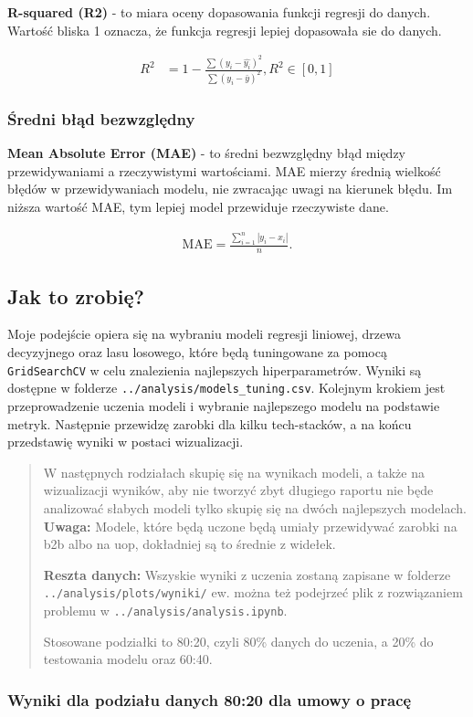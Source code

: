 \documentclass[a4paper]{article}
\begin{document}
\quad \textbf{R-squared (R2)} - to miara oceny dopasowania funkcji regresji do danych. Wartość bliska 1 oznacza, że funkcja regresji lepiej dopasowała sie do danych.

\begin{align} R^2&=1-\frac{\sum({y_i}-\hat{y_i})^2}{\sum(y_i-\bar{y})^2}, R^2 \in [0, 1] \end{align}

\subsubsection{Średni błąd bezwzględny}

\quad \textbf{Mean Absolute Error (MAE)} - to średni bezwzględny błąd między przewidywaniami a rzeczywistymi wartościami. MAE mierzy średnią wielkość błędów w przewidywaniach modelu, nie zwracając uwagi na kierunek błędu. Im niższa wartość MAE, tym lepiej model przewiduje rzeczywiste dane.

\begin{align}
    {\displaystyle \mathrm {MAE} ={\frac {\sum _{i=1}^{n}\left|y_{i}-x_{i}\right|}{n}}.}
\end{align}


\subsection{Jak to zrobię?}

\quad Moje podejście opiera się na wybraniu modeli regresji liniowej, drzewa decyzyjnego oraz lasu losowego, które będą
tuningowane za pomocą \texttt{GridSearchCV} w celu znalezienia najlepszych hiperparametrów. Wyniki są dostępne w folderze
\texttt{../analysis/models\_tuning.csv}. Kolejnym krokiem jest przeprowadzenie uczenia modeli i wybranie najlepszego modelu
na podstawie metryk. Następnie przewidzę zarobki dla kilku tech-stacków, a na końcu przedstawię wyniki w postaci wizualizacji.

\begin{abstract}
    \quad W następnych rodziałach skupię się na wynikach modeli, a także na wizualizacji wyników, aby nie
    tworzyć zbyt długiego raportu nie będe analizować słabych modeli tylko skupię się na dwóch najlepszych modelach.
    \textbf{Uwaga: } Modele, które będą uczone będą umiały przewidywać zarobki na b2b albo na uop, dokładniej są to średnie z widełek.

    \textbf{Reszta danych: } Wszyskie wyniki z uczenia zostaną zapisane w folderze \texttt{../analysis/plots/wyniki/} ew. można też
    podejrzeć plik z rozwiązaniem problemu w \texttt{../analysis/analysis.ipynb}.

    \quad Stosowane podziałki to 80:20, czyli 80\% danych do uczenia, a 20\% do testowania modelu oraz 60:40.
\end{abstract}

\subsubsection{Wyniki dla podziału danych 80:20 dla umowy o pracę}
\end{document}
